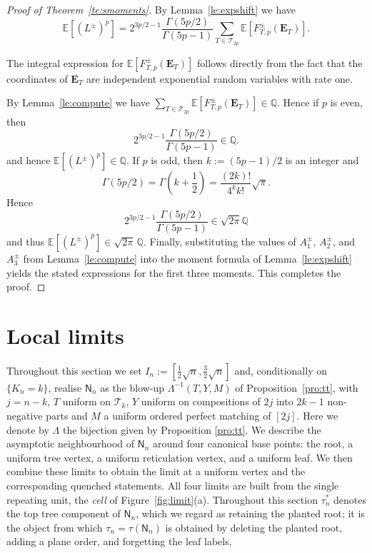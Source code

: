 \documentclass[english,11pt]{smfart}
\newcommand{\ndQ}{\mathbb{Q}}
\newcommand{\Ex}[1]{\mathbb{E}[#1]}
\newcommand{\cT}{\mathcal{T}}
\newcommand{\mN}{\mathsf{N}}
\numberwithin{equation}{section}
\begin{document}
\begin{proof}[Proof of Theorem~\ref{te:smoments}]
	By Lemma~\ref{le:expshift} we have
	\[
		\Ex{(L^\pm)^p} = 2^{3p/2-1}\frac{\Gamma(5p/2)}{\Gamma(5p-1)} \sum_{T\in\cT_{2p}} \Ex{F_{T,p}^\pm(\bm E_T)}.
	\]
	
	The integral expression for $\Ex{F_{T,p}^\pm(\bm E_T)}$ follows directly
	from the fact that the coordinates of $\bm{E}_T$ are independent exponential
	random variables with rate one. 
	
	By Lemma~\ref{le:compute} we have $\sum_{T\in\cT_{2p}} \Ex{F_{T,p}^\pm(\bm E_T)} \in \ndQ$. Hence if $p$ is even, then
	\[
		2^{3p/2-1}\frac{\Gamma(5p/2)}{\Gamma(5p-1)} \in \ndQ.
	\]
	and hence $\Ex{(L^\pm)^p} \in \ndQ$. If $p$ is odd, then $k := (5p-1)/2$ is an integer and
	\[
		\Gamma(5p/2) =  \Gamma\left(k + \frac{1}{2}\right) = \frac{(2k)!}{4^k k!}\sqrt{\pi}.
	\]
	Hence 
	\[
			2^{3p/2-1}\frac{\Gamma(5p/2)}{\Gamma(5p-1)} \in \sqrt{2 \pi} \ndQ
	\]
and thus \(\Ex{(L^\pm)^p} \in \sqrt{2\pi}\,\ndQ\). Finally, substituting
the values of \(A_1^\pm\), \(A_2^\pm\), and \(A_3^\pm\) from
Lemma~\ref{le:compute} into the moment formula of
Lemma~\ref{le:expshift} yields the stated expressions for the first three
moments. This completes the proof.
\end{proof}



\section{Local limits}
\label{sec:local}


Throughout this section we set $I_n:=[\tfrac12\sqrt n,\tfrac32\sqrt n]$ and,
conditionally on $\{K_n=k\}$, realise $\mN_n$ as the blow-up
$\Lambda^{-1}(T,Y,M)$ of Proposition~\ref{pro:tt}, with $j=n-k$, $T$ uniform on
$\cT_k$, $Y$ uniform on compositions of $2j$ into $2k-1$ non-negative parts and
$M$ a uniform ordered perfect matching of $[2j]$. Here we denote by $\Lambda$ the bijection given by Proposition \ref{pro:tt}. We describe the asymptotic neighbourhood of \(\mN_n\) around four
canonical base points: the root, a uniform tree vertex, a uniform
reticulation vertex, and a uniform leaf. We then combine these limits to
obtain the limit at a uniform vertex and the corresponding quenched
statements.
All four limits are built from the single repeating unit, the \emph{cell} of
Figure~\ref{fig:limit}(a). Throughout this section $\tau_n^{*}$ denotes the top tree
component of $\mN_n$, which we regard as retaining the planted root; it is the
object from which $\tau_n = \tau(\mN_n)$ is obtained by deleting the planted root, adding
a plane order, and forgetting the leaf labels.
\end{document}
